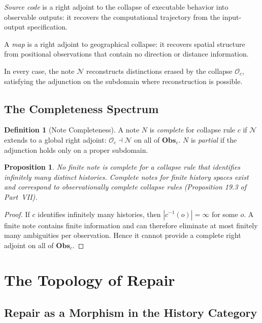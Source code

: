\documentclass[12pt, a4paper, openany]{book}
\theoremstyle{plain}
\newtheorem{proposition}[theorem]{Proposition}
\theoremstyle{definition}
\newtheorem{definition}[theorem]{Definition}
\theoremstyle{remark}
\newcommand{\Obs}{\mathbf{Obs}}
\begin{document}
\emph{Source code} is a right adjoint to the collapse of executable behavior
into observable outputs: it recovers the computational trajectory from the
input-output specification.

A \emph{map} is a right adjoint to geographical collapse: it recovers spatial
structure from positional observations that contain no direction or distance
information.

In every case, the note $\mathcal{N}$ reconstructs distinctions erased by the
collapse $\mathcal{O}_c$, satisfying the adjunction on the subdomain where
reconstruction is possible.

\section{The Completeness Spectrum}

\begin{definition}[Note Completeness]
A note $N$ is \emph{complete} for collapse rule $c$ if $\mathcal{N}$ extends to a
global right adjoint: $\mathcal{O}_c \dashv \mathcal{N}$ on all of $\Obs_c$.
$N$ is \emph{partial} if the adjunction holds only on a proper subdomain.
\end{definition}

\begin{proposition}
No finite note is complete for a collapse rule that identifies infinitely many
distinct histories. Complete notes for finite history spaces exist and correspond
to observationally complete collapse rules (Proposition 19.3 of Part~VII).
\end{proposition}

\begin{proof}
If $c$ identifies infinitely many histories, then $|c^{-1}(o)| = \infty$ for
some $o$. A finite note contains finite information and can therefore eliminate
at most finitely many ambiguities per observation. Hence it cannot provide a
complete right adjoint on all of $\Obs_c$.
\end{proof}

\chapter{The Topology of Repair}

\section{Repair as a Morphism in the History Category}
\end{document}
